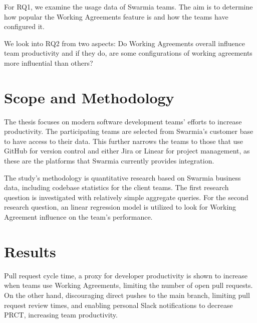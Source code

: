 For RQ1, we examine the usage data of Swarmia teams. The aim is to determine how popular the Working Agreements feature is and how the teams have configured it. 

We look into RQ2 from two aspects: Do Working Agreements overall influence team productivity and if they do, are some configurations of working agreements more influential than others? 

\section{Scope and Methodology}

The thesis focuses on modern software development teams' efforts to increase productivity. The participating teams are selected from Swarmia's customer base to have access to their data. This further narrows the teams to those that use GitHub for version control and either Jira or Linear for project management, as these are the platforms that Swarmia currently provides integration. 

The study's methodology is quantitative research based on Swarmia business data, including codebase statistics for the client teams. The first research question is investigated with relatively simple aggregate queries. For the second research question, an linear regression model is utilized to look for Working Agreement influence on the team's performance. 

\section{Results}


Pull request cycle time, a proxy for developer productivity is shown to increase when teams use Working Agreements, limiting the number of open pull requests. On the other hand, discouraging direct pushes to the main branch, limiting pull request review times, and enabling personal Slack notifications to decrease PRCT, increasing team productivity. 